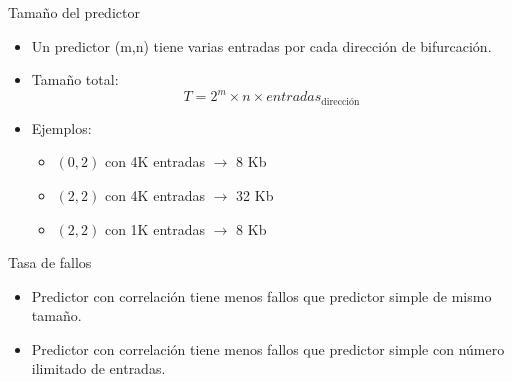 \begin{frame}[t]{Tamaño del predictor}
\begin{itemize}
  \item Un predictor (m,n) tiene varias entradas por cada dirección de
        bifurcación.

  \item Tamaño total:
\[
T = 2^m \times n \times entradas_{\text{dirección}}
\]

  \item Ejemplos:
    \begin{itemize}
      \item $(0,2)$ con 4K entradas $\rightarrow$ 8 Kb
      \item $(2,2)$ con 4K entradas $\rightarrow$ 32 Kb
      \item $(2,2)$ con 1K entradas $\rightarrow$ 8 Kb
   \end{itemize}
\end{itemize}
\end{frame}

\begin{frame}[t]{Tasa de fallos}
\begin{itemize}
  \item Predictor con correlación tiene menos fallos que predictor simple de mismo tamaño.
  \item Predictor con correlación tiene menos fallos que predictor simple con número ilimitado de entradas.
\end{itemize}

\end{frame}


